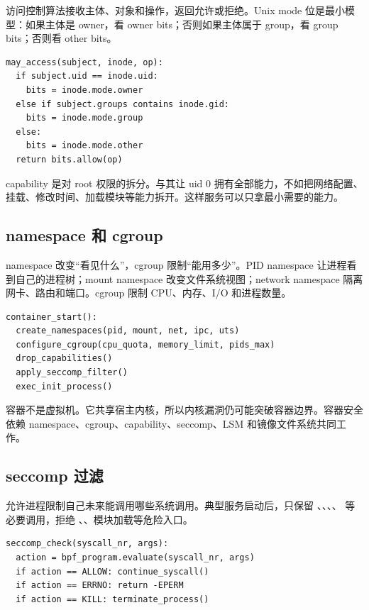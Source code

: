 访问控制算法接收主体、对象和操作，返回允许或拒绝。Unix mode 位是最小模型：如果主体是 owner，看 owner bits；否则如果主体属于 group，看 group bits；否则看 other bits。

\begin{lstlisting}
may_access(subject, inode, op):
  if subject.uid == inode.uid:
    bits = inode.mode.owner
  else if subject.groups contains inode.gid:
    bits = inode.mode.group
  else:
    bits = inode.mode.other
  return bits.allow(op)
\end{lstlisting}

capability 是对 root 权限的拆分。与其让 uid 0 拥有全部能力，不如把网络配置、挂载、修改时间、加载模块等能力拆开。这样服务可以只拿最小需要的能力。

\subsection{namespace 和 cgroup}

namespace 改变“看见什么”，cgroup 限制“能用多少”。PID namespace 让进程看到自己的进程树；mount namespace 改变文件系统视图；network namespace 隔离网卡、路由和端口。cgroup 限制 CPU、内存、I/O 和进程数量。

\begin{lstlisting}
container_start():
  create_namespaces(pid, mount, net, ipc, uts)
  configure_cgroup(cpu_quota, memory_limit, pids_max)
  drop_capabilities()
  apply_seccomp_filter()
  exec_init_process()
\end{lstlisting}

容器不是虚拟机。它共享宿主内核，所以内核漏洞仍可能突破容器边界。容器安全依赖 namespace、cgroup、capability、seccomp、LSM 和镜像文件系统共同工作。

\subsection{seccomp 过滤}

 允许进程限制自己未来能调用哪些系统调用。典型服务启动后，只保留 、、、、 等必要调用，拒绝 、、模块加载等危险入口。

\begin{lstlisting}
seccomp_check(syscall_nr, args):
  action = bpf_program.evaluate(syscall_nr, args)
  if action == ALLOW: continue_syscall()
  if action == ERRNO: return -EPERM
  if action == KILL: terminate_process()
\end{lstlisting}

